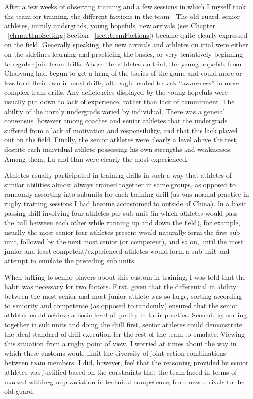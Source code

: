 \begin{CJK}{UTF8}{gbsn}
After a few weeks of observing training and a few sessions in which I myself took the team for training, the different factions in the team---The old guard, senior athletes, unruly undergrads, young hopefuls, new arrivals (see Chapter ~\ref{chap:ethnoSetting} Section ~\ref{sect:teamFactions}) became quite clearly expressed on the field.  Generally speaking, the new arrivals and athletes on trial were either on the sidelines learning and practicing the basics, or very tentatively beginning to regular join team drills. Above the athletes on trial, the young hopefuls from Chaoyang had begun to get a hang of the basics of the game and could more or less hold their own in most drills, although tended to lack ``awareness'' in more complex team drills.  Any deficiencies displayed by the young hopefuls were usually put down to lack of experience, rather than lack of commitment.  The ability of the unruly undergrads varied by individual. There was a general consensus, however among coaches and senior athletes that the undergrads suffered from a lack of motivation and responsibility, and that this lack played out on the field.  Finally, the senior athletes were clearly a level above the rest, despite each individual athlete possessing his own strengths and weaknesses.  Among them, Lu and Han were clearly the most experienced.

Athletes usually participated in training drills in such a way that athletes of similar abilities almost always trained together in same groups, as opposed to randomly assorting into subunits for each training drill (as was normal practice in rugby training sessions I had become accustomed to outside of China). In a basic passing drill involving four athletes per sub unit (in which athletes would pass the ball between each other while running up and down the field), for example, usually the most senior four athletes present would naturally form the first sub-unit, followed by the next most senior (or competent), and so on, until the most junior and least competent/experienced athletes would form a sub unit and attempt to emulate the preceding sub units.

When talking to senior players about this custom in training, I was told that the habit was necessary for two factors. First, given that the differential in ability between the most senior and most junior athlete was so large, sorting according to seniority and competence (as opposed to randomly) ensured that the senior athletes could achieve a basic level of quality in their practice.  Second, by sorting together in sub units and doing the drill first, senior athletes could demonstrate the ideal standard of drill execution for the rest of the team to emulate.  Viewing this situation from a rugby point of view, I worried at times about the way in which these customs would limit the diversity of joint action combinations between team members. I did, however, feel that the reasoning provided by senior athletes was justified based on the constraints that the team faced in terms of marked within-group variation in technical competence, from new arrivals to the old guard.  


\end{CJK}

